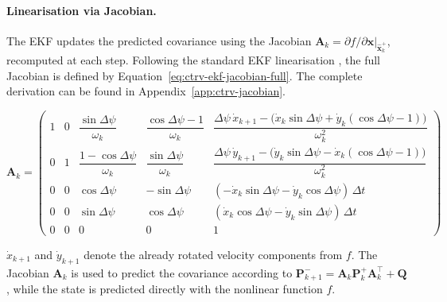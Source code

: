     \paragraph{Linearisation via Jacobian.}
    The \ac{EKF} updates the predicted covariance using the Jacobian
    $\mathbf{A}_k = \partial f / \partial \mathbf{x}|_{\hat{\mathbf{x}}^+_k}$,
    recomputed at each step. 
    Following the standard \ac{EKF} linearisation \parencite{Thrun2005}, the full %
    Jacobian is defined by Equation~\ref{eq:ctrv-ekf-jacobian-full}. The complete derivation can be found in Appendix~\ref{app:ctrv-jacobian}.


    \begin{equation}
    \mathbf{A}_k =
    \begin{pmatrix}
    1 & 0 & \dfrac{\sin\Delta\psi}{\omega_k} & \dfrac{\cos\Delta\psi - 1}{\omega_k} & \dfrac{\Delta\psi\,\dot{x}_{k+1} - \bigl(\dot{x}_k\sin\Delta\psi + \dot{y}_k(\cos\Delta\psi-1)\bigr)}{\omega_k^2} \\[8pt]
    0 & 1 & \dfrac{1 - \cos\Delta\psi}{\omega_k} & \dfrac{\sin\Delta\psi}{\omega_k} & \dfrac{\Delta\psi\,\dot{y}_{k+1} - \bigl(\dot{y}_k\sin\Delta\psi - \dot{x}_k(\cos\Delta\psi-1)\bigr)}{\omega_k^2} \\[8pt]
    0 & 0 & \cos\Delta\psi & -\sin\Delta\psi & (-\dot{x}_k\sin\Delta\psi - \dot{y}_k\cos\Delta\psi)\,\Delta t \\[4pt]
    0 & 0 & \sin\Delta\psi & \cos\Delta\psi  & (\dot{x}_k\cos\Delta\psi - \dot{y}_k\sin\Delta\psi)\,\Delta t \\[4pt]
    0 & 0 & 0 & 0 & 1
    \end{pmatrix}
    \label{eq:ctrv-ekf-jacobian-full}
    \end{equation}

  

    
    $\dot{x}_{k+1}$ and $\dot{y}_{k+1}$ denote the already rotated
    velocity components from $f$. The Jacobian $\mathbf{A}_k$ is used to
    predict the covariance according to 
    $\mathbf{P}^-_{k+1} = \mathbf{A}_k \mathbf{P}^+_k \mathbf{A}_k^\top + \mathbf{Q}$,
    while the state is predicted directly with the nonlinear function $f$.
    

